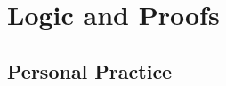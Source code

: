 \newpage
\chapter{Logic and Proofs}
\section{Personal Practice}
\begin{bt} \end{bt}
\begin{bt} \end{bt}
\begin{bt} \end{bt}
\begin{bt} \end{bt}
\begin{bt} \end{bt}
\begin{bt} \end{bt}
\begin{bt} \end{bt}
\begin{bt} \end{bt}
\begin{bt} \end{bt}
\begin{bt} \end{bt}
\begin{bt} \end{bt}
\begin{bt} \end{bt}
\begin{bt} \end{bt}
\begin{bt} \end{bt}
\begin{bt} \end{bt}
\begin{bt} \end{bt}
\begin{bt} \end{bt}
\begin{bt} \end{bt}
\begin{bt} \end{bt}
\begin{bt} \end{bt}
\begin{bt} \end{bt}
\begin{bt} \end{bt}
\begin{bt} \end{bt}

